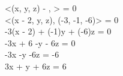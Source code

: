 <(x, y, z) - , > = 0 \implies \\
<(x - 2, y, z), (-3, -1, -6)> = 0 \implies \\
-3(x - 2) + (-1)y + (-6)z = 0 \implies \\
-3x + 6 -y - 6z = 0 \implies \\
-3x -y -6z = -6 \implies \\
3x + y + 6z = 6